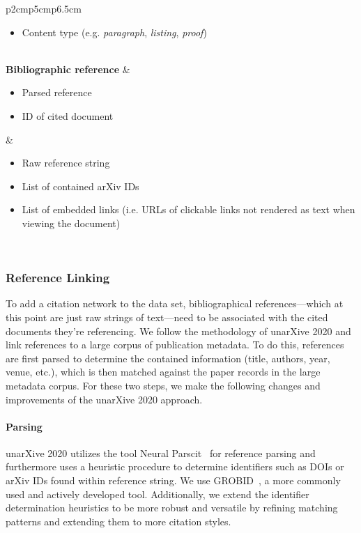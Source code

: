 \begin{table}
\begin{tabular}{p{2cm}p{5cm}p{6.5cm}}
\begin{minipage}[t]{\linewidth}
\begin{itemize}[leftmargin=1mm]
                \item Content type (e.g. \textit{paragraph}, \textit{listing}, \textit{proof})
            \end{itemize}
        \end{minipage}\\
    \textbf{Bib\-li\-o\-gra\-phic reference} &
        \begin{minipage}[t]{\linewidth}
            \begin{itemize}[leftmargin=1mm]
                \item Parsed reference
                \item ID of cited document
            \end{itemize}
        \end{minipage} &
        \begin{minipage}[t]{\linewidth}
            \begin{itemize}[leftmargin=1mm]
                \item Raw reference string
                \item List of contained arXiv IDs
                \item List of embedded links (i.e. URLs of clickable links not rendered as text when viewing the document)
            \end{itemize}
        \end{minipage}\\
  \bottomrule
\end{tabular}
\end{table}

\subsubsection{Reference Linking}\label{sec:reflink}

To add a citation network to the data set, bibliographical references---which at this point are just raw strings of text---need to be associated with the cited documents they're referencing. We follow the methodology of unarXive 2020 and link references to a large corpus of publication metadata. To do this, references are first parsed to determine the contained information (title, authors, year, venue, etc.), which is then matched against the paper records in the large metadata corpus. For these two steps, we make the following changes and improvements of the unarXive 2020 approach.

\paragraph{Parsing} unarXive 2020 utilizes the tool Neural Parscit~\cite{neuralparscit} for reference parsing and furthermore uses a heuristic procedure to determine identifiers such as DOIs or arXiv IDs found within reference string. We use GROBID~\cite{Lopez2009}, a more commonly used and actively developed tool. Additionally, we extend the identifier determination heuristics to be more robust and versatile by refining matching patterns and extending them to more citation styles.

